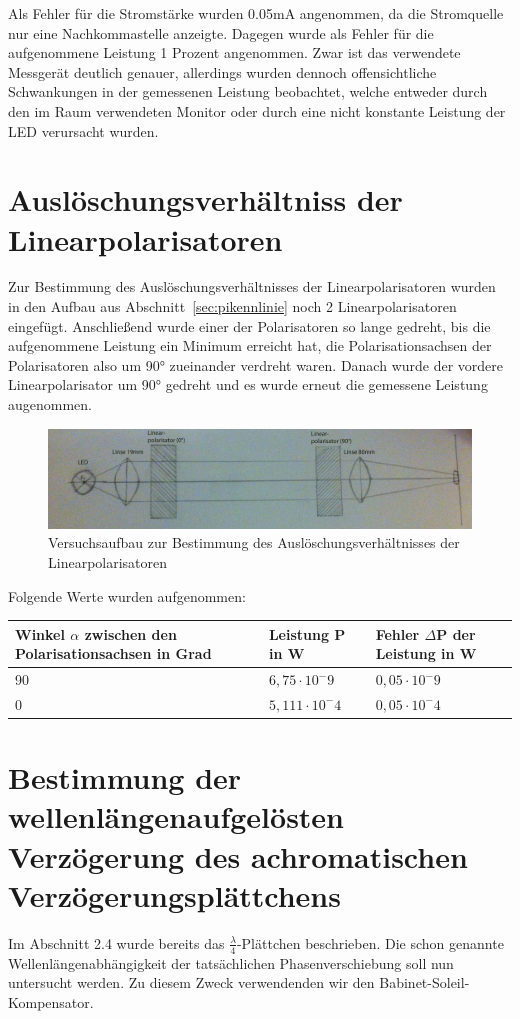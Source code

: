 \documentclass[bigchapter,colorback,accentcolor=tud4b,linedtoc,11pt]{tudreport}
\begin{document}
Als Fehler für die Stromstärke wurden 0.05mA angenommen, da die Stromquelle nur eine Nachkommastelle anzeigte. Dagegen wurde als Fehler für die aufgenommene Leistung 1 Prozent angenommen. Zwar ist das verwendete Messgerät deutlich genauer, allerdings wurden dennoch offensichtliche Schwankungen in der gemessenen Leistung beobachtet, welche entweder durch den im Raum verwendeten Monitor oder durch eine nicht konstante Leistung der LED verursacht wurden.

\section{Auslöschungsverhältniss der Linearpolarisatoren}
Zur Bestimmung des Auslöschungsverhältnisses der Linearpolarisatoren wurden in den Aufbau aus Abschnitt~\ref{sec:pikennlinie} noch 2 Linearpolarisatoren eingefügt.
Anschließend wurde einer der Polarisatoren so lange gedreht, bis die aufgenommene Leistung ein Minimum erreicht hat, die Polarisationsachsen der Polarisatoren also um 90° zueinander verdreht waren. Danach wurde der vordere Linearpolarisator um 90° gedreht und es wurde erneut die gemessene Leistung augenommen.

\begin{figure}[ht!]
\centering
\includegraphics[width=150mm]{img/skizzen/versuch_b.jpg}
\caption{Versuchsaufbau zur Bestimmung des Auslöschungsverhältnisses der Linearpolarisatoren}
\label{Auslöschungsverhältniss-Linearpolarisatoren}
\end{figure}
Folgende Werte wurden aufgenommen:
\begin{center}
  \begin{tabular}{|p{5cm}|p{4cm}|p{4.5cm}|}
    \hline
        Winkel $\alpha$ zwischen den Polarisationsachsen in Grad & Leistung P in W & Fehler $\Delta$P der Leistung in W \\ \hline
        90 & $6,75 \cdot 10^-9$ & $0,05 \cdot 10^-9$ \\ \hline
        0 & $5,111 \cdot 10^-4$ & $0,05 \cdot 10^-4$ \\ \hline
	\end{tabular}
\end{center}
\section{Bestimmung der wellenlängenaufgelösten Verzögerung des achromatischen Verzögerungsplättchens}
Im Abschnitt 2.4 wurde bereits das $\frac{\lambda}{4}$-Plättchen beschrieben. Die schon genannte Wellenlängenabhängigkeit der tatsächlichen Phasenverschiebung soll nun untersucht werden. Zu diesem Zweck verwendenden wir den Babinet-Soleil-Kompensator. 
\end{document}
